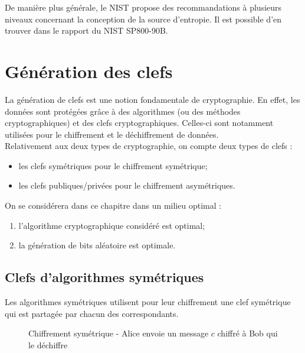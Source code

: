 De manière plus générale, le NIST propose des recommandations à plusieurs niveaux concernant la conception de la source d'entropie. Il est possible d'en trouver dans le rapport du NIST SP800-90B.
			

\section{Génération des clefs}
La génération de clefs est une notion fondamentale de cryptographie. En effet, les données sont protégées grâce à des algorithmes (ou des méthodes cryptographiques) et des clefs cryptographiques. Celles-ci sont notamment utilisées pour le chiffrement et le déchiffrement de données.\\
Relativement aux deux types de cryptographie, on compte deux types de clefs : 
\begin{itemize}
\item les clefs symétriques pour le chiffrement symétrique;
\item les clefs publiques/privées pour le chiffrement asymétriques.\\
\end{itemize}

On se considérera dans ce chapitre dans un milieu optimal : 
\begin{enumerate}
\item l'algorithme cryptographique considéré est optimal;
\item la génération de bits aléatoire est optimale.
\end{enumerate}


\subsection{Clefs d'algorithmes symétriques}
Les algorithmes symétriques utilisent pour leur chiffrement une clef symétrique qui est partagée par chacun des correspondants. 

\begin{figure}[H]
\begin{center}
\end{center}
\caption[Chiffrement symétrique]{Chiffrement symétrique - Alice envoie un message $c$ chiffré à Bob qui le déchiffre}
\label{sym}
\end{figure}


